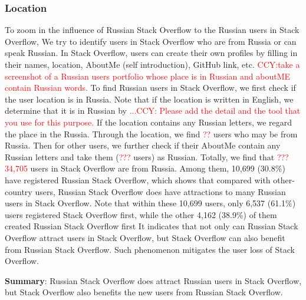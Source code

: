 \subsubsection {Location}
To zoom in the influence of Russian Stack Overflow to the Russian users in Stack Overflow, We try to identify users in Stack Overflow who are from Russia or can speak Russian.
In Stack Overflow, users can create their own profiles by filling in their names, location, AboutMe (self introduction), GitHub link, etc.
\textcolor{red}{CCY:take a screenshot of a Russian users portfolio whose place is in Russian and aboutME contain Russian words.}
To find Russian users in Stack Overflow, we first check if the user location is in Russia.
Note that if the location is written in English, we determine that it is in Russian by  \textcolor{red}{...CCY: Please add the detail and the tool that you use for this purpose.} 
If the location contains any Russian letters, we regard the place in the Russia.
Through the location, we find \textcolor{red}{??} users who may be from Russia.
Then for other users, we further check if their AboutMe contain any Russian letters and take them (\textcolor{red}{???} users) as Russian.
Totally, we find that \textcolor{red}{???34,705} users in Stack Overflow are from Russia.
Among them, 10,699 (30.8\%) have registered Russian Stack Overflow, which shows that compared with other-country users, Russian Stack Overflow does have attractions to many Russian users in Stack Overflow. 
Note that within these 10,699 users, only 6,537 (61.1\%) users registered Stack Overflow first, while the other 4,162 (38.9\%) of them created Russian Stack Overflow first
It indicates that not only can Russian Stack Overflow attract users in Stack Overflow, but Stack Overflow can also benefit from Russian Stack Overflow.
Such phenomenon mitigates the user loss of Stack Overflow.

\textbf{Summary}:
Russian Stack Overflow does attract Russian users in Stack Overflow, but Stack Overflow also benefits the new users from Russian Stack Overflow.
 
